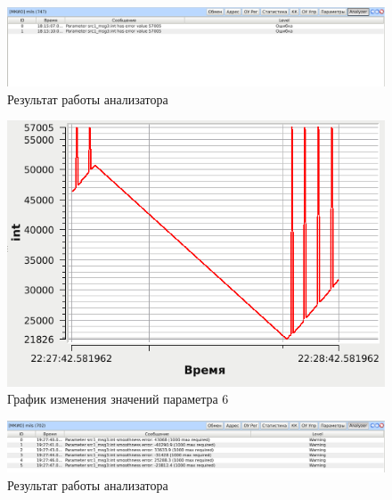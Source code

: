 \begin{figure}[H]
 \centering
 \includegraphics[scale=0.4]{tests/param_error_value/report}
 \caption{Результат работы анализатора}
 \label{fig:param_error_value_report}
\end{figure}



\begin{figure}[H]
 \centering
 \includegraphics[scale=0.6]{tests/param_smooth/graph}
 \caption{График изменения значений параметра 6}
 \label{fig:param_smooth_graph}
\end{figure}

\begin{figure}[H]
 \centering
 \includegraphics[scale=0.4]{tests/param_smooth/report}
 \caption{Результат работы анализатора}
 \label{fig:param_smooth_report}
\end{figure}